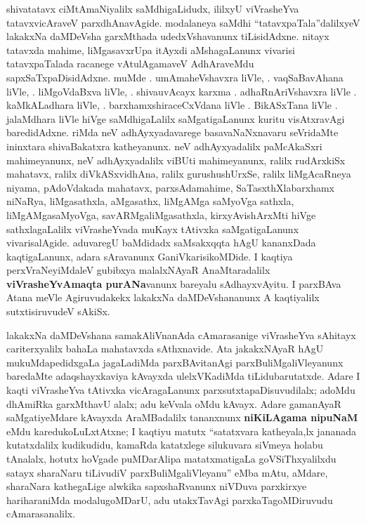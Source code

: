 shivatatavx ciMtAmaNiyalilx  saMdhigaLidudx, ililxyU viVrasheYva tatavxvicAraveV parxdhAnavAgide. modalaneya saMdhi ``tatavxpaTala''dalilxyeV lakakxNa daMDeVsha garxMthada udedxVshavanunx tiLisidAdxne. nitayx tatavxda mahime, liMgasavxrUpa itAyxdi aMshagaLanunx vivarisi tatavxpaTalada racanege vAtulAgamaveV AdhAraveMdu sapxSaTxpaDisidAdxne. muMde . umAmaheVshavxra liVle, . vaqSaBavAhana liVle, . liMgoVdaBxva liVle, . shivauvAcayx karxma . adhaRnAriVshavxra liVle . kaMkALadhara liVle, . barxhamxshiraceCxVdana liVle . BikASxTana liVle . jalaMdhara liVle hiVge  saMdhigaLalilx  saMgatigaLanunx kuritu visAtxravAgi baredidAdxne. riMda neV adhAyxyadavarege basavaNaNxnavaru seVridaMte ininxtara shivaBakatxra katheyanunx. neV adhAyxyadalilx paMcAkaSxri mahimeyanunx, neV adhAyxyadalilx viBUti mahimeyanunx, ralilx rudArxkiSx mahatavx, ralilx diVkASxvidhAna, ralilx gurushushUrxSe, ralilx liMgAcaRneya niyama,  pAdoVdakada mahatavx,  parxsAdamahime,  SaTasxthXlabarxhamx niNaRya,  liMgasathxla,  aMgasathx,  liMgAMga saMyoVga sathxla,  liMgAMgasaMyoVga,  savARMgaliMgasathxla,  kirxyAvishArxMti hiVge  sathxlagaLalilx viVrasheYvada muKayx tAtivxka saMgatigaLanunx vivarisalAgide. aduvaregU baMdidadx saMsakxqqta hAgU kananxDada kaqtigaLanunx, adara sAravanunx GaniVkarisikoMDide. I kaqtiya perxVraNeyiMdaleV gubibxya malalxNAyaR AnaMtaradalilx \textbf{viVrasheYvAmaqta purANa}vanunx bareyalu sAdhayxvAyitu. I parxBAva Atana meVle Agiruvudakekx lakakxNa daMDeVshananunx A kaqtiyalilx sutxtisiruvudeV sAkiSx.

lakakxNa daMDeVshana samakAliVnanAda cAmarasanige viVrasheYva sAhitayx cariterxyalilx bahaLa mahatavxda sAthxnavide. Ata jakakx\-NAyaR hAgU mukuMdapedidxgaLa jagaLadiMda parxBAvitanAgi parxBuliMgaliVleyanunx baredaMte adaqshayxkaviya kAvayxda ulelxVKadiMda tiLidubarutatxde. Adare I kaqti viVrasheYva tAtivxka vicAragaLanunx parxsutxtapaDisuvudilalx; adoMdu dhAmiRka garxMthavU alalx; adu keVvala oMdu kAvayx. Adare gamanAyaR saMgatiyeMdare kAvayxda AraMBadalilx tananxnunx \textbf{niKiLAgama nipuNaM} eMdu karedukoLuLxtAtxne; I kaqtiyu matutx ``satatxvara katheyala,lx jananada kutatxdalilx kudikudidu, kamaRda katatxlege silukuvara siVmeya holabu tAnalalx, hotutx hoVgade puMDarAlipa matatxmatigaLa goVSiThxyalilxdu satayx sharaNaru tiLivudiV parxBuliMgaliVleyanu'' eMba mAtu, aMdare, sharaNara kathegaLige alwkika sapxshaRvanunx niVDuva parxkirxye hariharaniMda modalugoMDarU, adu utakxTavAgi parxkaTagoMDiruvudu cAmarasanalilx.

